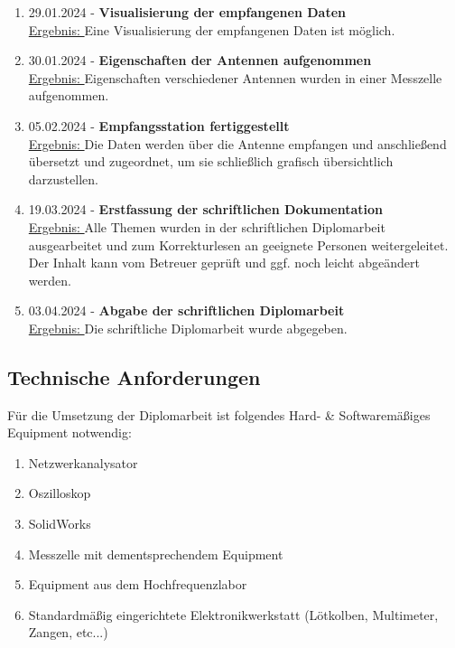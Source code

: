 \begin{enumerate}
	\item 29.01.2024 - \textbf{Visualisierung der empfangenen Daten}\\
	\underline{Ergebnis: }Eine Visualisierung der empfangenen Daten ist möglich. 
	
	\item 30.01.2024 - \textbf{Eigenschaften der Antennen aufgenommen}\\
	\underline{Ergebnis: }Eigenschaften verschiedener Antennen wurden in einer Messzelle aufgenommen. 
	
	\item 05.02.2024 - \textbf{Empfangsstation fertiggestellt}\\
	\underline{Ergebnis: } Die Daten werden über die Antenne empfangen und anschließend übersetzt und 
	zugeordnet, um sie schließlich grafisch übersichtlich darzustellen.
	
	\item 19.03.2024 - \textbf{Erstfassung der schriftlichen Dokumentation}\\
	\underline{Ergebnis: } Alle Themen wurden in der schriftlichen Diplomarbeit ausgearbeitet und zum 
	Korrekturlesen an geeignete Personen weitergeleitet. Der Inhalt kann vom Betreuer geprüft und 
	ggf. noch leicht abgeändert werden.
	
	\item 03.04.2024 - \textbf{Abgabe der schriftlichen Diplomarbeit}\\
	\underline{Ergebnis: } Die schriftliche Diplomarbeit wurde abgegeben. 
\end{enumerate}

\subsection{Technische Anforderungen}
Für die Umsetzung der Diplomarbeit ist folgendes Hard- \& Softwaremäßiges Equipment notwendig:
\begin{enumerate}
	\item Netzwerkanalysator
	\item Oszilloskop
	\item SolidWorks
	\item Messzelle mit dementsprechendem Equipment
	\item Equipment aus dem Hochfrequenzlabor
	\item Standardmäßig eingerichtete Elektronikwerkstatt (Lötkolben, Multimeter, Zangen, etc...)
\end{enumerate}

